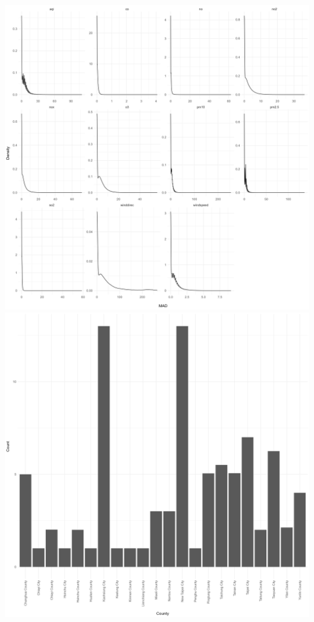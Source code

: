 \documentclass[./report.tex]{subfiles}
\begin{document}
\begin{enumerate}
  \includegraphics[width=6in]{plots/question7/density.png}
  \includegraphics[width=6in]{plots/question7/qq.png}
\end{enumerate}
\end{document}
